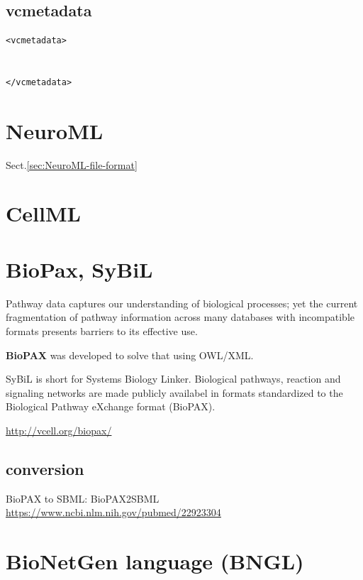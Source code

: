 \subsection{vcmetadata}
\label{sec:vcmetadata-VCML}

\begin{verbatim}
<vcmetadata>


</vcmetadata>
\end{verbatim}





\section{NeuroML}
\label{sec:NeuroML}

Sect.\ref{sec:NeuroML-file-format}

\section{CellML}
\label{sec:CellML}


\section{BioPax, SyBiL}
\label{sec:BioPax}
\label{sec:SyBiL}

Pathway data captures our understanding of biological processes; yet the current
fragmentation of pathway information across many databases with incompatible
formats presents barriers to its effective use.

{\bf BioPAX} was developed to solve that using OWL/XML.

SyBiL is short for Systems Biology Linker. Biological pathways, reaction and
signaling networks are made publicly availabel in formats standardized to the
Biological Pathway eXchange format (BioPAX).  

\url{http://vcell.org/biopax/}

\subsection{conversion}

BioPAX to SBML: BioPAX2SBML 
\url{https://www.ncbi.nlm.nih.gov/pubmed/22923304}

\section{BioNetGen language (BNGL)}
\label{sec:BNGL}


